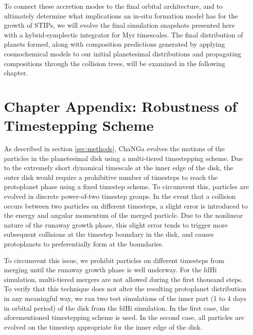 To connect these accretion modes to the final orbital architecture,
and to ultimately determine what implications an in-situ formation model has for the growth of STIPs, we will evolve the final 
simulation snapshots presented here with a hybrid-symplectic integrator for Myr timescales. The final distribution of planets 
formed, along with composition predictions generated by applying cosmochemical models to our initial planetesimal distributions 
and propagating compositions through the collision trees, will be examined in the following chapter.

\section{Chapter Appendix: Robustness of Timestepping Scheme}\label{sec:rung_ecc}

As described in section \ref{sec:methods}, {\sc ChaNGa}
  evolves the motions of the particles in the planetesimal disk using
  a multi-tiered timestepping scheme. Due to the extremely short
  dynamical timescale at the inner edge of the disk, the outer disk
  would require a prohibitive number of timesteps to reach the
  protoplanet phase using a fixed timestep scheme.  To circumvent this, particles are evolved in discrete power-of-two timestep groups. In the event that a collision occurs between two particles on different timesteps, a slight error is introduced to the energy and angular momentum of the merged particle. Due to the nonlinear nature of the runaway growth phase, this slight error tends to trigger more subsequent collisions at the timestep boundary in the disk, and causes protoplanets to preferentially form at the boundaries.

To circumvent this issue, we prohibit particles on different timesteps from merging until the runaway growth phase is well underway. For the fdHi simulation, multi-tiered mergers are not allowed during the first thousand steps. To verify that this technique does not alter the resulting protoplanet distribution in any meaningful way, we ran two test simulations of the inner part (1 to 4 days in orbital period) of the disk from the fdHi simulation. In the first case, the aforementioned timestepping scheme is used. In the second case, all particles are evolved on the timestep appropriate for the inner edge of the disk.

